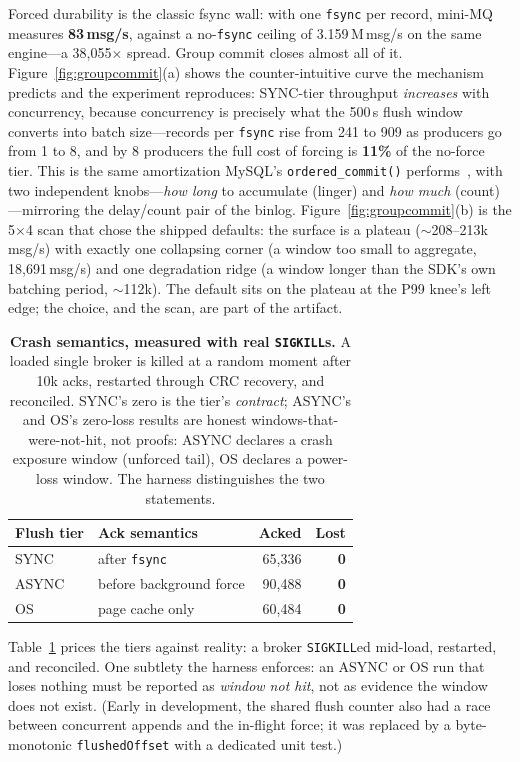 \documentclass[letterpaper,twocolumn,10pt]{article}
\begin{document}
Forced durability is the classic fsync wall: with one \texttt{fsync}
per record, mini-MQ measures \textbf{83\,msg/s}, against a
no-\texttt{fsync} ceiling of 3.159\,M\,msg/s on the same engine---a
38{,}055$\times$ spread. Group commit closes almost all of it.
Figure~\ref{fig:groupcommit}(a) shows the counter-intuitive curve the
mechanism predicts and the experiment reproduces: SYNC-tier throughput
\emph{increases} with concurrency, because concurrency is precisely
what the 500\,\textmu s flush window converts into batch size---records
per \texttt{fsync} rise from 241 to 909 as producers go from 1 to 8, and
by 8 producers the full cost of forcing is \textbf{11\%} of the
no-force tier. This is the same amortization MySQL's
\texttt{ordered\_commit()} performs~\cite{mysqlbinlog,gray93tp}, with
two independent knobs---\emph{how long} to accumulate (linger) and
\emph{how much} (count)---mirroring the delay/count pair of the binlog.
Figure~\ref{fig:groupcommit}(b) is the 5$\times$4 scan that chose the
shipped defaults: the surface is a plateau (${\sim}$208--213k\,msg/s)
with exactly one collapsing corner (a window too small to aggregate,
18{,}691\,msg/s) and one degradation ridge (a window longer than the
SDK's own batching period, ${\sim}$112k). The default sits on the
plateau at the P99 knee's left edge; the choice, and the scan, are part
of the artifact.

\begin{table}[t]
\centering
\small
\begin{tabular}{llrr}
\toprule
Flush tier & Ack semantics & Acked & Lost \\
\midrule
SYNC  & after \texttt{fsync}        & 65{,}336 & \textbf{0} \\
ASYNC & before background force    & 90{,}488 & \textbf{0} \\
OS    & page cache only            & 60{,}484 & \textbf{0} \\
\bottomrule
\end{tabular}
\caption{\textbf{Crash semantics, measured with real
\texttt{SIGKILL}s.} A loaded single broker is killed at a random
moment after 10k acks, restarted through CRC recovery, and reconciled.
SYNC's zero is the tier's \emph{contract}; ASYNC's and OS's zero-loss
results are honest windows-that-were-not-hit, not proofs: ASYNC
declares a crash exposure window (unforced tail), OS declares a
power-loss window. The harness distinguishes the two statements.}
\label{tab:kill9}
\end{table}

Table~\ref{tab:kill9} prices the tiers against reality: a broker
\texttt{SIGKILL}ed mid-load, restarted, and reconciled. One subtlety
the harness enforces: an ASYNC or OS run that loses nothing must be
reported as \emph{window not hit}, not as evidence the window does not
exist. (Early in development, the shared flush counter also had a race
between concurrent appends and the in-flight force; it was replaced by
a byte-monotonic \texttt{flushedOffset} with a dedicated unit test.)
\end{document}
